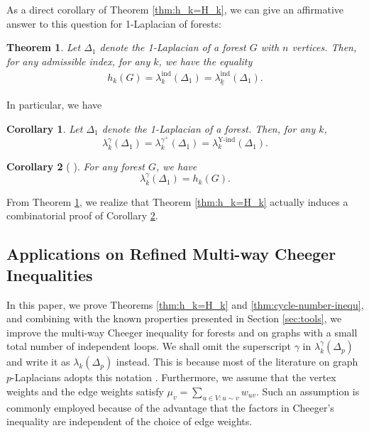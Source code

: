 \documentclass[12pt, reqno]{article}
\newtheorem{theorem}{Theorem}
\newtheorem{cor}%
{Corollary}
\begin{document}
As a direct corollary of Theorem \ref{thm:h_k=H_k}, we can give an affirmative answer to this question for 1-Laplacian of forests:

\begin{theorem}\label{thm:1-Lap=h}
Let $\Delta_1$ denote the 1-Laplacian of a forest $G$ with $n$ vertices. Then, for any admissible index, for any $k$, we have the equality
\begin{align*}
h_k(G)=\lambda_k^{\mathrm{ind}}(\Delta_1)=\underline{\lambda_k^{\mathrm{ind}}}(\Delta_1).%
\end{align*}
\end{theorem}

In particular, we have
\begin{cor}\label{cor:minmax-indepen-index}
Let $\Delta_1$ denote the 1-Laplacian of a forest. Then, for any $k$, 
$$ \lambda_k^{\gamma}(\Delta_1)=\lambda_k^{\gamma^+}(\Delta_1) =\lambda_k^{\textrm{Y-ind}}(\Delta_1).$$
\end{cor}

\begin{cor}[%
\cite{Deidda-thesis,Deidda}]\label{cor:tree-1-Lap-h}
For any forest $G$, we have $$\lambda_{k}^\gamma(\Delta_1)= h_k(G).$$
\end{cor}

From Theorem \ref{thm:1-Lap=h}, we realize that Theorem \ref{thm:h_k=H_k} actually induces a combinatorial proof of Corollary \ref{cor:tree-1-Lap-h}. 

\subsection{Applications on Refined Multi-way Cheeger Inequalities%
}\label{sec:refined-Cheeger}

In this paper, we prove Theorems \ref{thm:h_k=H_k} and 
\ref{thm:cycle-number-inequ}, and combining with the known properties presented in Section \ref{sec:tools}, we improve the multi-way Cheeger inequality for forests and on graphs with a small total number of independent loops. We shall omit the superscript $\gamma$ in $\lambda_{k}^\gamma(\Delta_p)$ and write it as $\lambda_{k}(\Delta_p)$ instead. This is because most of the literature on graph $p$-Laplacians adopts this notation \cite{Deidda,LMR,Tudisco}. Furthermore, we assume that the vertex weights and the edge weights satisfy $\mu_v=\sum_{u\in V:u\sim v}w_{uv}$. Such an assumption is commonly employed because of the advantage that the factors in Cheeger's inequality are independent of the choice of edge weights.
\end{document}
